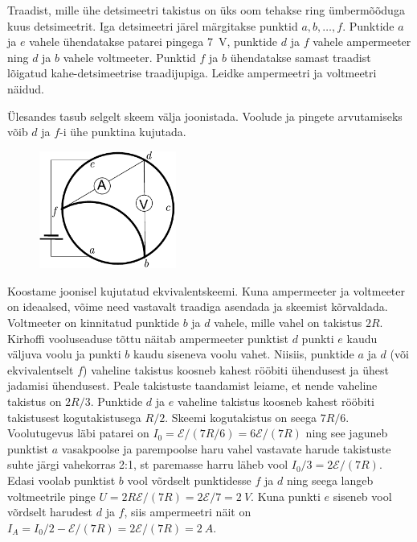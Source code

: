 
Traadist, mille ühe detsimeetri takistus on üks oom tehakse ring ümbermõõduga kuus detsimeetrit. Iga detsimeetri järel märgitakse punktid $a, b, \ldots, f$. Punktide $a$ ja $e$ vahele ühendatakse patarei pingega \SI{7}{V}, punktide $d$ ja $f$ vahele ampermeeter ning $d$ ja $b$ vahele voltmeeter. Punktid $f$ ja $b$ ühendatakse samast traadist lõigatud kahe-detsimeetrise traadijupiga. Leidke ampermeetri ja voltmeetri näidud.




\hint
Ülesandes tasub selgelt skeem välja joonistada. Voolude ja pingete arvutamiseks võib $d$ ja $f$-i ühe punktina kujutada.\solu
\begin{figure}
	\vspace{-20pt}
	\begin{center}
		\includegraphics[width = 0.4\textwidth]{2018-lahg-03-yl.pdf}
	\end{center}
\end{figure}

Koostame joonisel kujutatud ekvivalentskeemi. Kuna ampermeeter ja voltmeeter on ideaalsed, võime need vastavalt traadiga asendada ja skeemist kõrvaldada. Voltmeeter on kinnitatud punktide $b$ ja $d$ vahele, mille vahel on takistus $2R$. Kirhoffi vooluseaduse tõttu näitab ampermeeter punktist $d$ punkti $e$ kaudu väljuva voolu ja punkti $b$ kaudu siseneva voolu vahet. Niisiis, punktide $a$ ja $d$ (või ekvivalentselt $f$) vaheline takistus koosneb kahest rööbiti ühendusest ja ühest jadamisi ühendusest. Peale takistuste taandamist leiame, et nende vaheline takistus on $2R/3$. Punktide $d$ ja $e$ vaheline takistus koosneb kahest rööbiti takistusest kogutakistusega $R/2$. Skeemi kogutakistus on seega $7R/6$. Voolutugevus läbi patarei on $I_0 = \mathcal{E}/(7R/6) = 6\mathcal{E}/(7R)$ ning see jaguneb punktist $a$ vasakpoolse ja parempoolse haru vahel vastavate harude takistuste suhte järgi vahekorras 2:1, st paremasse harru läheb vool $I_0/3 = 2\mathcal{E}/(7R)$. Edasi voolab punktist $b$ vool võrdselt punktidesse $f$ ja $d$ ning seega langeb voltmeetrile pinge $U = 2R\mathcal{E}/(7R) = 2\mathcal{E}/7=\SI{2}{V}$. Kuna punkti $e$ siseneb vool võrdselt harudest $d$ ja $f$, siis ampermeetri näit on $I_A = I_0/2 - \mathcal{E}/(7R) = 2\mathcal{E}/(7R) = \SI{2}{A}$.\probend